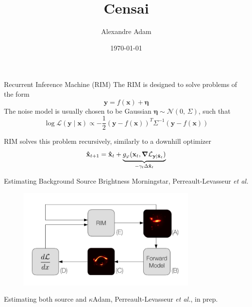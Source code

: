 \documentclass{beamer}
\institute[] %
{
		Département de Physique\\
		Université de Montréal
}
\title{Censai}
\subtitle{}
\author{Alexandre Adam}
\date{\today}
\begin{document}
\begin{frame}
	\titlepage
\end{frame}


\begin{frame}{Recurrent Inference Machine (RIM)}
The RIM is designed to solve problems of the form
\[
	\mathbf{y} = f(\mathbf{x}) + \boldsymbol{\eta} 
\]
The noise model is usually chosen to be Gaussian $\boldsymbol{\eta} \sim \mathcal{N}(0,\, \Sigma) $, such that
\[
	\log\mathcal{L}(\mathbf{y} \mid \mathbf{x}) \propto - \frac{1}{2}(\mathbf{y} - f(\mathbf{x}))^T
\Sigma^{-1}(\mathbf{y} - f(\mathbf{x}))
\]

RIM solves this problem recursively, similarly to a downhill optimizer
\[
	\mathbf{\hat{x}}_{t+1} = \mathbf{\hat{x}}_t + 
\underbrace{
g_\varphi(\mathbf{x}_t, \grad \mathcal{L}_{\mathbf{y} \mid\mathbf{\hat{x}}_t })
}_{-\gamma_t\Delta \mathbf{\hat{x}}_t}
\]
\end{frame}


\begin{frame}{Estimating Background Source Brightness}
        {Morningstar, Perreault-Levasseur \textit{et al.}}
\begin{figure}[H]
        \centering
        \includegraphics[width=0.8\textwidth]{slide_morningstar2019}
\end{figure}
\end{frame}

\begin{frame}{Estimating both source and $\kappa$}{Adam, Perreault-Levasseur \textit{et al.}, in prep.}
\begin{figure}[H]
        
\end{figure}
\end{frame}

\end{document}
